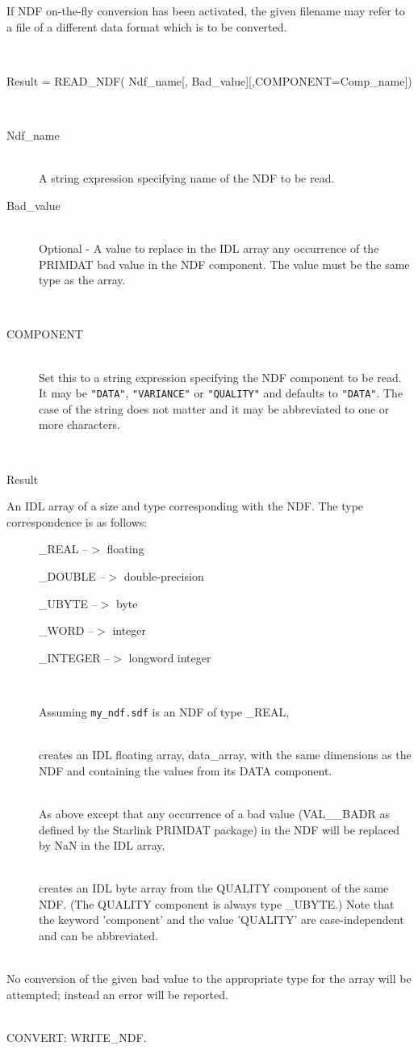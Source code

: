 \documentclass[twoside,11pt]{article}
\newcommand{\htmlref}[2]{#1}
\newcommand{\CONVERT}{{\footnotesize CONVERT}}
\newlength{\sstexampleslength}
\newcommand{\sstusage}[1]{\item[Usage:] \mbox{}
\\[1.3ex]{\raggedright \ssttt #1}}
\newcommand{\sstarguments}[1]{
   \item[Arguments:] \mbox{} \\
   \vspace{-3.5ex}
   \begin{description}
      #1
   \end{description}
}
\newcommand{\sstkeywords}[1]{
   \item[Keywords:] \mbox{} \\
   \vspace{-3.5ex}
   \begin{description}
      #1
   \end{description}
}
\newcommand{\sstreturnedvalue}[1]{
   \item[Returned Value:] \mbox{} \\
   \vspace{-3.5ex}
   \begin{description}
      #1
   \end{description}
}
\newcommand{\sstexamples}[1]{
   \goodbreak
   \item[Examples:] \mbox{} \\
   \vspace{-3.5ex}
   \begin{description}
      #1
   \end{description}
}
\newcommand{\sstsubsection}[1]{ \item[{#1}] \mbox{} \\}
\newcommand{\sstexamplesubsection}[2]{\sloppy
\item[\parbox{\sstexampleslength}{\ssttt #1}] \mbox{} \vspace{0.5ex}
\\ #2 \vspace{1.0ex}}
\newcommand{\sstdiytopic}[2]{\goodbreak \item[{\hspace{-0.35em}#1\hspace{-0.35em}:}] \mbox{} \\[1.3ex] #2}
\newcommand{\sstitem}{\item}
\newcommand{\sstusage}[1]{\item[\htmlref{Usage:}{app_usage}]
      \begin{description}
         {\ssttt #1}
      \end{description}
      \\
   }
\newcommand{\sstarguments}[1]{
      \item[Arguments:] \\
      \begin{description}
         #1
      \end{description}
      \\
   }
\newcommand{\sstkeywords}[1]{
      \item[Keywords:] \\
      \begin{description}
         #1
      \end{description}
      \\
   }
\newcommand{\sstreturnedvalue}[1]{
      \item[Returned Value:] \\
      \begin{description}
         #1
      \end{description}
      \\
   }
\newcommand{\sstexamples}[1]{
   \item[\vspace{0.35ex}\htmlref{Examples:\vspace{-0.5ex}}{app_example}]
      \begin{description}
         #1
      \end{description}
      \\
   }
\newcommand{\sstsubsection}[1]{\item[{#1}]}
\newcommand{\sstexamplesubsection}[2]{
   \vspace{-1.0ex} \item[{\ssttt #1}] #2 \vspace{0.2ex}}
\newcommand{\sstdiytopic}[2]{\\ \item[{#1}:]
      \begin{description}
         #2
      \end{description}
   }
\newcommand{\sstitem}{\item}
\begin{document}
{{      If NDF on-the-fly conversion has been activated, the given filename may
      refer to a file of a different data format which is to be converted.
   }
   \sstusage{
	Result = READ\_NDF( Ndf\_name[, Bad\_value][,COMPONENT=Comp\_name])
   }
   \sstarguments{
      \sstsubsection{
         Ndf\_name
      }{
         A string expression specifying name of the NDF to be read.
      }
      \sstsubsection{
         Bad\_value
      }{
         Optional - A value to replace in the IDL array any occurrence of
         the PRIMDAT bad value in the NDF component.  The value must be the 
         same type as the array.
      }
   }
   \sstkeywords{
      \sstsubsection{
         COMPONENT
      }{
         Set this to a string expression specifying the NDF component to be 
         read.  It may be {\texttt{"DATA"}}, {\texttt{"VARIANCE"}} or 
         {\texttt{"QUALITY"}} and defaults to {\texttt{"DATA"}}. 
         The case of the string does not matter and it may be 
         abbreviated to one or more characters.
      }
   }
   \sstreturnedvalue{
      \sstitem{
         Result
      }{
         An IDL array of a size and type corresponding with the NDF. The type
         correspondence is as follows:
         \begin{description}
            \item[]\_REAL --$>$ floating
            \item[]\_DOUBLE --$>$ double-precision
            \item[]\_UBYTE --$>$  byte
            \item[]\_WORD --$>$  integer
            \item[]\_INTEGER --$>$  longword integer
         \end{description}
      }
   }
   \sstexamples{
      \item[] Assuming \texttt{my\_ndf.sdf} is an NDF of type \_REAL,
      \sstexamplesubsection{
         IDL> data\_array = read\_ndf('my\_ndf')
      }{
         creates an IDL floating array, data\_array, with the same dimensions
         as the NDF and containing the values from its DATA component.
      }
      \sstexamplesubsection{
         IDL> data\_array = read\_ndf('my\_ndf', !values.f\_nan)
      }{
         As above except that any occurrence of a bad value (VAL\_\_BADR as 
         defined by the Starlink PRIMDAT package) in the NDF will be replaced
         by NaN in the IDL array.
      }
      \sstexamplesubsection{
         IDL> quality = read\_ndf('my\_ndf',comp='q')
      }{
         creates an IDL byte array from the QUALITY component of the same NDF.
         (The QUALITY component is always type \_UBYTE.)
         Note that the keyword 'component' and the value 'QUALITY' are 
         case-independent and can be abbreviated.
      }
   }
   \sstdiytopic{
      Deficiencies
   }{
      No conversion of the given bad value to the appropriate type for
      the array will be attempted; instead an error will be reported.
   }
   \sstdiytopic{
      Related Applications
   }{
      \CONVERT: \htmlref{WRITE\_NDF}{WRITE_NDF}.
   }
}
\end{document}
